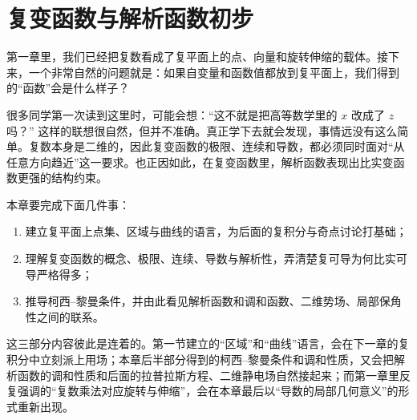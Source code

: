 
\chapter{复变函数与解析函数初步}

\begin{wulibj}[本章导读]
第一章里，我们已经把复数看成了复平面上的点、向量和旋转伸缩的载体。接下来，一个非常自然的问题就是：如果自变量和函数值都放到复平面上，我们得到的``函数''会是什么样子？

很多同学第一次读到这里时，可能会想：``这不就是把高等数学里的 $x$ 改成了 $z$ 吗？'' 这样的联想很自然，但并不准确。真正学下去就会发现，事情远没有这么简单。复数本身是二维的，因此复变函数的极限、连续和导数，都必须同时面对``从任意方向趋近''这一要求。也正因如此，在复变函数里，解析函数表现出比实变函数更强的结构约束。

本章要完成下面几件事：
\begin{enumerate}
    \item 建立复平面上点集、区域与曲线的语言，为后面的复积分与奇点讨论打基础；
    \item 理解复变函数的概念、极限、连续、导数与解析性，弄清楚复可导为何比实可导严格得多；
    \item 推导柯西--黎曼条件，并由此看见解析函数和调和函数、二维势场、局部保角性之间的联系。
\end{enumerate}

这三部分内容彼此是连着的。第一节建立的``区域''和``曲线''语言，会在下一章的复积分中立刻派上用场；本章后半部分得到的柯西--黎曼条件和调和性质，又会把解析函数的调和性质和后面的拉普拉斯方程、二维静电场自然接起来；而第一章里反复强调的``复数乘法对应旋转与伸缩''，会在本章最后以``导数的局部几何意义''的形式重新出现。
\end{wulibj}

